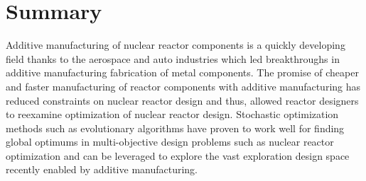 \section{Summary}
Additive manufacturing of nuclear reactor components is a quickly developing
field thanks to the aerospace and auto industries which led breakthroughs 
in additive manufacturing fabrication of metal components. 
The promise of cheaper and faster manufacturing of reactor components with 
additive manufacturing has reduced constraints on nuclear reactor 
design and thus, allowed reactor designers to reexamine optimization of 
nuclear reactor design. 
Stochastic optimization methods such as evolutionary algorithms have proven to 
work well for finding global optimums in multi-objective design problems such as 
nuclear reactor optimization and can be leveraged to explore the vast exploration 
design space recently enabled by additive manufacturing.